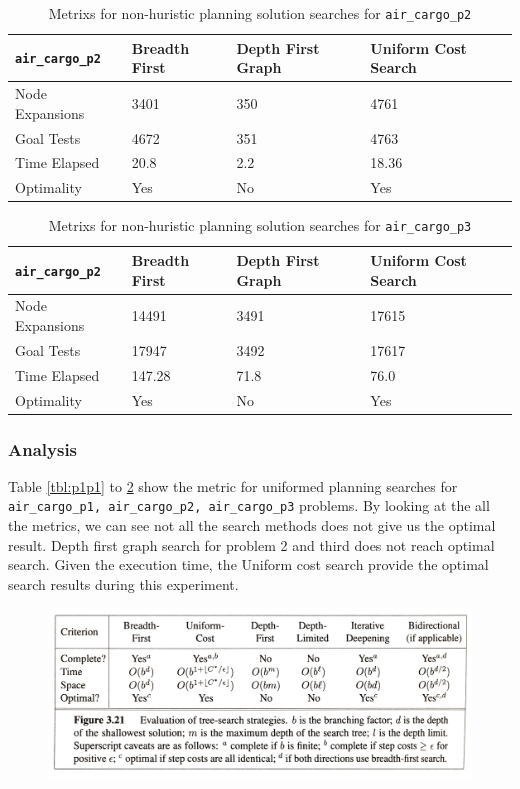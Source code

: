 \documentclass{article}
\begin{document}
\begin{table}[h]
\begin{center}
\begin{tabular}{|l|l|l|l|}
\hline
{\tt air\_cargo\_p2} & Breadth First & Depth First Graph& Uniform Cost Search \\ \hline\hline
Node Expansions& 3401  & 350 &4761 \\ 
Goal Tests & 4672 & 351 & 4763\\ 
Time Elapsed& 20.8 & 2.2 & 18.36\\ 
Optimality & Yes & No & Yes\\ \hline
\end{tabular}
\end{center}
\caption{Metrixs for non-huristic planning solution searches for {\tt air\_cargo\_p2}}
\label{tbl:p1p2}
\end{table}

\begin{table}[h]
\begin{center}
\begin{tabular}{|l|l|l|l|}
\hline
{\tt air\_cargo\_p2} & Breadth First & Depth First Graph& Uniform Cost Search \\ \hline\hline
Node Expansions& 14491  &  3491& 17615 \\ 
Goal Tests & 17947& 3492  & 17617 \\ 
Time Elapsed& 147.28 &71.8  & 76.0 \\ 
Optimality & Yes & No & Yes\\ \hline
\end{tabular}
\end{center}
\caption{Metrixs for non-huristic planning solution searches for {\tt air\_cargo\_p3}}
\label{tbl:p1p3}
\end{table}
\subsubsection*{Analysis}

Table \ref{tbl:p1p1} to \ref{tbl:p1p3} show the metric for uniformed planning searches for {\tt air\_cargo\_p1, air\_cargo\_p2, air\_cargo\_p3} problems. By looking at the all the metrics, we can see not all the search methods does not give us the optimal result. Depth first graph search for problem 2 and third does not reach optimal search. Given the execution time, the Uniform cost search provide the optimal search results during this experiment.
\begin{figure}[h]
\includegraphics[width=\textwidth]{search}
\end{figure}
\end{document}
